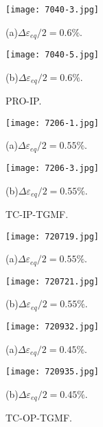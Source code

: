 \begin{figure}
  \begin{minipage}[t]{0.5\linewidth}
  \nonumber
    \centering
    \texttt{[image: 7040-3.jpg]}
    \centerline{(a)$\Delta \varepsilon_{eq}/2=0.6\%$.}
  \end{minipage}%
  \begin{minipage}[t]{0.5\linewidth}
    \centering
    \texttt{[image: 7040-5.jpg]}
    \centerline{(b)$\Delta \varepsilon_{eq}/2=0.6\%$.}
  \end{minipage}
  \caption{PRO-IP.}
  \label{Fig:MicrostructureofInconel718}
\end{figure}

\begin{figure}
  \begin{minipage}[t]{0.5\linewidth}
  \nonumber
    \centering
    \texttt{[image: 7206-1.jpg]}
    \centerline{(a)$\Delta \varepsilon_{eq}/2=0.55\%$.}
  \end{minipage}%
  \begin{minipage}[t]{0.5\linewidth}
    \centering
    \texttt{[image: 7206-3.jpg]}
    \centerline{(b)$\Delta \varepsilon_{eq}/2=0.55\%$.}
  \end{minipage}
  \caption{TC-IP-TGMF.}
  \label{Fig:MicrostructureofInconel718}
\end{figure}

\begin{figure}
  \begin{minipage}[t]{0.5\linewidth}
  \nonumber
    \centering
    \texttt{[image: 720719.jpg]}
    \centerline{(a)$\Delta \varepsilon_{eq}/2=0.55\%$.}
  \end{minipage}%
  \begin{minipage}[t]{0.5\linewidth}
    \centering
    \texttt{[image: 720721.jpg]}
    \centerline{(b)$\Delta \varepsilon_{eq}/2=0.55\%$.}
  \end{minipage}

  \begin{minipage}[t]{0.5\linewidth}
  \nonumber
    \centering
    \texttt{[image: 720932.jpg]}
    \centerline{(a)$\Delta \varepsilon_{eq}/2=0.45\%$.}
  \end{minipage}%
  \begin{minipage}[t]{0.5\linewidth}
    \centering
    \texttt{[image: 720935.jpg]}
    \centerline{(b)$\Delta \varepsilon_{eq}/2=0.45\%$.}
  \end{minipage}

  \caption{TC-OP-TGMF.}
  \label{Fig:MicrostructureofInconel718}
\end{figure}

